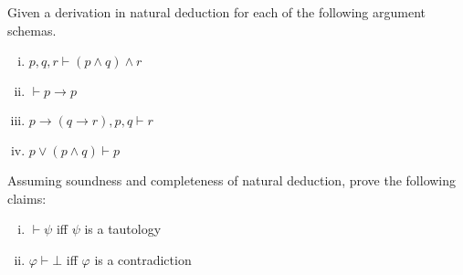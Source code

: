 \documentclass[nobib,nofonts]{tufte-handout}
\begin{document}
\bigskip
\noindent \colorbox{mygray}{\centering
  \begin{minipage}{1.0\textwidth}

    \begin{exercise}
      Given a derivation in natural deduction for each of the following argument schemas.
      \begin{enumerate}[(i)]
        \item $p, q, r \vdash (p \wedge q) \wedge r$
        \item $\vdash p \rightarrow p$
        \item $p \rightarrow (q \rightarrow r), p, q \vdash r$
        \item $p \vee (p \wedge q) \vdash p$
      \end{enumerate}
    \end{exercise}

    \begin{exercise}
      Assuming soundness and completeness of natural deduction, prove the following claims:
      \begin{enumerate}[(i)]
        \item $\vdash \psi$ iff $\psi$ is a tautology
        \item $\varphi \vdash \bot$ iff $\varphi$ is a contradiction
      \end{enumerate}
    \end{exercise}
  \end{minipage}

}
\end{document}
